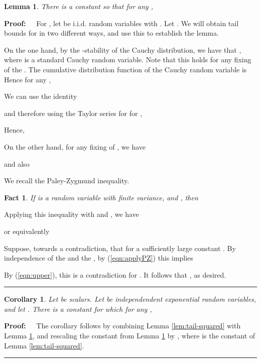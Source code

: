 \documentclass[11pt]{article}
\newtheorem{lemma}[theorem]{Lemma}
\newtheorem{corollary}[theorem]{Corollary}
\newenvironment{proof}{\begin{trivlist} \item {\bf Proof:~~}}
  {\qed\end{trivlist}}
\def\qed{\hfill\rule{2mm}{2mm}}
\newtheorem{fact}{Fact}
\begin{document}
\begin{lemma}\label{lem:cauchy-l2}
There is a constant  so that for any ,

\end{lemma}
\begin{proof}
For , let  be i.i.d. random variables with . 
Let . We will obtain tail bounds for  in two different ways, and use this to establish
the lemma.

On the one hand, by the -stability of the Cauchy distribution, we have that , where  is a standard
Cauchy random variable. Note that this holds for any fixing of the . The cumulative distribution function
of the Cauchy random variable is  Hence for any ,

We can use the identity 

and therefore using the Taylor series for  for ,

Hence,

On the other hand, for any fixing of , we have

and also 

We recall the Paley-Zygmund inequality.
\begin{fact}
If  is a random variable with finite variance, and , then

\end{fact}
Applying this inequality with  and , we have

or equivalently 

Suppose, towards a contradiction, that  for a sufficiently large constant . By independence of the  and the , by
(\ref{eqn:applyPZ}) this implies

By (\ref{eqn:upper}), this is a contradiction for . It follows that , as desired. 
\end{proof} 

\begin{corollary}\label{cor:upper}
Let  be scalars. 
Let  be  independendent exponential random variables, 
and let . There is a constant  for which for any ,

\end{corollary}
\begin{proof}
The corollary follows by combining Lemma \ref{lem:tail-squared} with Lemma \ref{lem:cauchy-l2}, and rescaling the constant  from Lemma \ref{lem:cauchy-l2}
by , where  is the constant of Lemma \ref{lem:tail-squared}. 
\end{proof}
\end{document}
